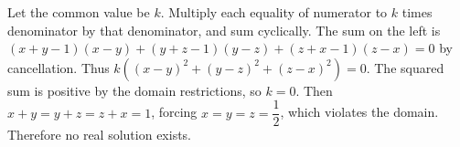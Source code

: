 Let the common value be $k$. Multiply each equality of numerator to $k$ times denominator by that denominator, and sum cyclically. The sum on the left is $(x+y-1)(x-y)+(y+z-1)(y-z)+(z+x-1)(z-x)=0$ by cancellation. Thus $k((x-y)^2+(y-z)^2+(z-x)^2)=0$. The squared sum is positive by the domain restrictions, so $k=0$. Then $x+y=y+z=z+x=1$, forcing $x = y = z = \dfrac{1}{2}$, which violates the domain. Therefore no real solution exists.
